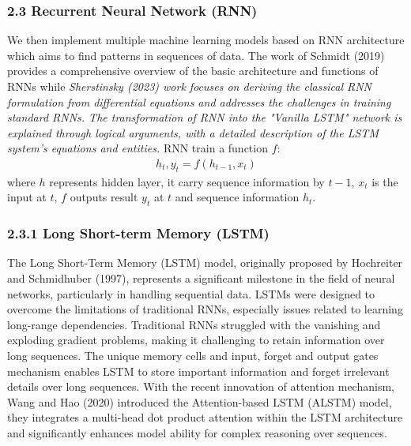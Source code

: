 \documentclass[10pt,letterpaper]{article}
\begin{document}
\subsubsection*{2.3 Recurrent Neural Network (RNN)}
We then implement multiple machine learning models based on RNN architecture which aims to find patterns in sequences of data. The work of Schmidt (2019) provides a comprehensive overview of the basic architecture and functions of RNNs while \textit{Sherstinsky (2023) work focuses on deriving the classical RNN formulation from differential equations and addresses the challenges in training standard RNNs. The transformation of RNN into the "Vanilla LSTM" network is explained through logical arguments, with a detailed description of the LSTM system's equations and entities. }
RNN train a function $f$:
\begin{eqnarray}
\label{eq: RNN}
    {h_{t}, y_t} = f(h_{t - 1}, x_t)
\end{eqnarray}
where $h$ represents hidden layer, it carry sequence information by $t - 1$, $x_t$ is the input at $t$, $f$ outputs result $y_t$ at $t$ and sequence information $h_t$.

\subsubsection*{2.3.1 Long Short-term Memory (LSTM)}
The Long Short-Term Memory (LSTM) model, originally proposed by Hochreiter and Schmidhuber (1997), represents a significant milestone in the field of neural networks, particularly in handling sequential data. LSTMs were designed to overcome the limitations of traditional RNNs, especially issues related to learning long-range dependencies. Traditional RNNs struggled with the vanishing and exploding gradient problems, making it challenging to retain information over long sequences. The unique memory cells and input, forget and output gates mechanism enables LSTM to store important information and forget irrelevant details over long sequences. With the recent innovation of attention mechanism, Wang and Hao (2020) introduced the Attention-based LSTM (ALSTM) model, they integrates a multi-head dot product attention within the LSTM architecture and significantly enhances model ability for complex reasoning over sequences.
\end{document}
